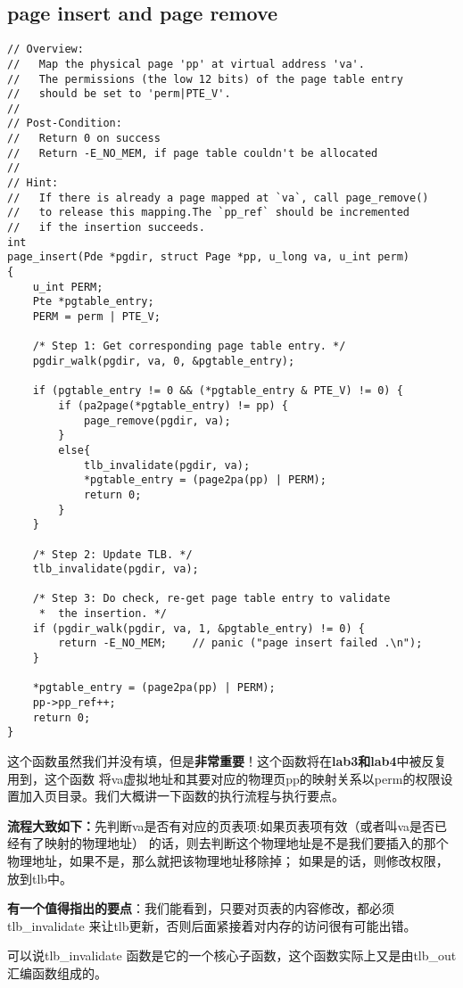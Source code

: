 \subsection{page insert and page remove}

\begin{verbatim}
// Overview:
//   Map the physical page 'pp' at virtual address 'va'.
//   The permissions (the low 12 bits) of the page table entry
//   should be set to 'perm|PTE_V'.
//
// Post-Condition:
//   Return 0 on success
//   Return -E_NO_MEM, if page table couldn't be allocated
//
// Hint:
//   If there is already a page mapped at `va`, call page_remove()
//   to release this mapping.The `pp_ref` should be incremented
//   if the insertion succeeds.
int
page_insert(Pde *pgdir, struct Page *pp, u_long va, u_int perm)
{
	u_int PERM;
	Pte *pgtable_entry;
	PERM = perm | PTE_V;

	/* Step 1: Get corresponding page table entry. */
	pgdir_walk(pgdir, va, 0, &pgtable_entry);

	if (pgtable_entry != 0 && (*pgtable_entry & PTE_V) != 0) {
		if (pa2page(*pgtable_entry) != pp) {
			page_remove(pgdir, va);
		}
		else{
			tlb_invalidate(pgdir, va);
			*pgtable_entry = (page2pa(pp) | PERM);
			return 0;
		}
	}

	/* Step 2: Update TLB. */
	tlb_invalidate(pgdir, va);

	/* Step 3: Do check, re-get page table entry to validate
	 *  the insertion. */
	if (pgdir_walk(pgdir, va, 1, &pgtable_entry) != 0) {
		return -E_NO_MEM;    // panic ("page insert failed .\n");
	}

	*pgtable_entry = (page2pa(pp) | PERM);
	pp->pp_ref++;
	return 0;
}
\end{verbatim}

这个函数虽然我们并没有填，但是\textbf{非常重要}！这个函数将在\textbf{lab3和lab4}中被反复用到，这个函数
将va虚拟地址和其要对应的物理页pp的映射关系以perm的权限设置加入页目录。我们大概讲一下函数的执行流程与执行要点。

\textbf{流程大致如下：}先判断va是否有对应的页表项:如果页表项有效（或者叫va是否已经有了映射的物理地址）
的话，则去判断这个物理地址是不是我们要插入的那个物理地址，如果不是，那么就把该物理地址移除掉；
如果是的话，则修改权限，放到tlb中。

\textbf{有一个值得指出的要点}：我们能看到，只要对页表的内容修改，都必须tlb\_invalidate 来让tlb更新，否则后面紧接着对内存的访问很有可能出错。

可以说tlb\_invalidate 函数是它的一个核心子函数，这个函数实际上又是由tlb\_out 汇编函数组成的。

